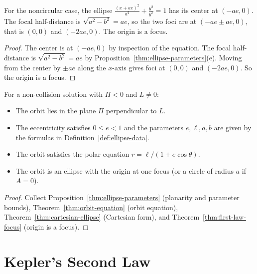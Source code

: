 \begin{theorem}\label{thm:first-law-focus}
For the noncircular case, the ellipse $\tfrac{(x+ae)^2}{a^2} + \tfrac{y^2}{b^2} = 1$ has its center at $(-ae, 0)$.
The focal half-distance is $\sqrt{a^2 - b^2} = ae$, so the two foci are at $(-ae \pm ae, 0)$, that is $(0, 0)$ and $(-2ae, 0)$.
The origin is a focus.
\leanok
\begin{proof}
The center is at $(-ae, 0)$ by inspection of the equation.
The focal half-distance is $\sqrt{a^2 - b^2} = ae$ by Proposition~\ref{thm:ellipse-parameters}(e).
Moving from the center by $\pm ae$ along the $x$-axis gives foci at $(0, 0)$ and $(-2ae, 0)$.
So the origin is a focus.
\end{proof}
\end{theorem}

\begin{theorem}\label{thm:first-law-source}
For a non-collision solution with $H < 0$ and $L \neq 0$:
\begin{itemize}
  \item The orbit lies in the plane $\Pi$ perpendicular to $L$.
  \item The eccentricity satisfies $0 \le e < 1$ and the parameters $e, \ell, a, b$ are given by the formulas in Definition~\ref{def:ellipse-data}.
  \item The orbit satisfies the polar equation $r = \ell/(1 + e\cos\theta)$.
  \item The orbit is an ellipse with the origin at one focus (or a circle of radius $a$ if $A = 0$).
\end{itemize}
\leanok
\begin{proof}
Collect Proposition~\ref{thm:ellipse-parameters} (planarity and parameter bounds),
Theorem~\ref{thm:orbit-equation} (orbit equation),
Theorem~\ref{thm:cartesian-ellipse} (Cartesian form), and
Theorem~\ref{thm:first-law-focus} (origin is a focus).
\end{proof}
\end{theorem}

\chapter{Kepler's Second Law}

